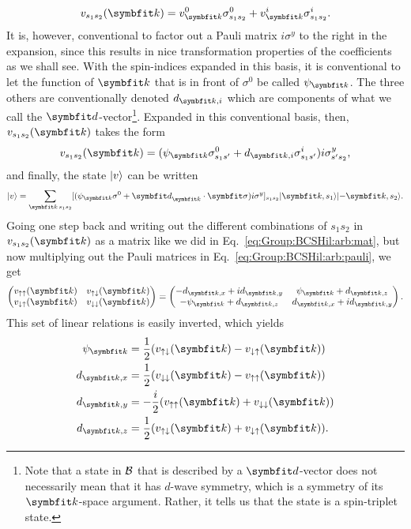 \begin{equation}
    \label{eq:GroupBCSHil:arb:pauliExp}
    v_{s_1s_2}(\v{k}) = v^0_\v{k}\sigma^0_{s_1s_2} + v^i_\v{k}\sigma^i_{s_1s_2}.
\end{equation}
It is, however, conventional to factor out a Pauli matrix $i\sigma^y$ to the right in the expansion, since this results in nice transformation properties
of the coefficients as we shall see.
With the spin-indices expanded in this basis, it is conventional to let the function of $\v{k}$
that is in front of $\sigma^0$ be called $\psi_\v{k}$. The three others are conventionally denoted $d_{\v{k},i}$ which are components of what we call
the $\v{d}$-vector\footnote{Note that a state in $\mathcal{B}$ that is described by a $\v{d}$-vector does not necessarily mean that it has $d$-wave symmetry,
which is a symmetry of its $\v{k}$-space argument. Rather, it tells us that the state is a spin-triplet state.}. Expanded in this conventional basis,
then, $v_{s_1s_2}(\v{k})$ takes the form
\begin{equation}
    \label{eq:Group:BCSHil:arb:pauli}
    v_{s_1s_2}(\v{k}) = (\psi_\v{k}\sigma^0_{s_1s'} + d_{\v{k},i}\sigma^i_{s_1s'})i\sigma^y_{s's_2},
\end{equation}
and finally, the state $\lvert v \rangle$ can be written
\begin{equation}
    \label{eq:Group:BCSHil:arb:ket}
    \ket{v} = \sum_{\v{k}\,s_1s_2}[(\psi_\v{k}\sigma^0 + \v{d}_\v{k}\cdot\v{\sigma})i\sigma^y]_{s_1s_2}\ket{\v{k},s_1}\ket{-\v{k},s_2}.
\end{equation}
Going one step back and writing out the different combinations of $s_1s_2$ in $v_{s_1s_2}(\v{k})$ as a matrix like we did in
Eq.~\eqref{eq:Group:BCSHil:arb:mat}, but now multiplying out the Pauli matrices in Eq.~\eqref{eq:Group:BCSHil:arb:pauli}, we get
\begin{equation}
    \label{eq:Group:BCSHil:arb:mat:Pauli}
    \begin{pmatrix}
        v_{\up\up}(\v{k}) & v_{\up\dn}(\v{k})\\
        v_{\dn\up}(\v{k}) & v_{\dn\dn}(\v{k})
    \end{pmatrix} =
    \begin{pmatrix}
        -d_{\v{k},x}+id_{\v{k},y} & \psi_\v{k}+d_{\v{k},z}\\
        -\psi_\v{k}+d_{\v{k},z} & d_{\v{k},x}+id_{\v{k},y}
    \end{pmatrix}.
\end{equation}
This set of linear relations is easily inverted, which yields
\begin{align}
    \label{eq:Group:BCSHil:arb:inverseRel:psi}
    \psi_\v{k} &= \frac{1}{2}(v_{\up\dn}(\v{k}) - v_{\dn\up}(\v{k}))\\
    \label{eq:Group:BCSHil:arb:inverseRel:dx}
    d_{\v{k},x} &= \frac{1}{2}(v_{\dn\dn}(\v{k})-v_{\up\up}(\v{k}))\\
    \label{eq:Group:BCSHil:arb:inverseRel:dy}
    d_{\v{k},y} &= -\frac{i}{2}(v_{\up\up}(\v{k})+v_{\dn\dn}(\v{k}))\\
    \label{eq:Group:BCSHil:arb:inverseRel:dz}
    d_{\v{k},z} &= \frac{1}{2}(v_{\up\dn}(\v{k})+v_{\dn\up}(\v{k})).
\end{align}


